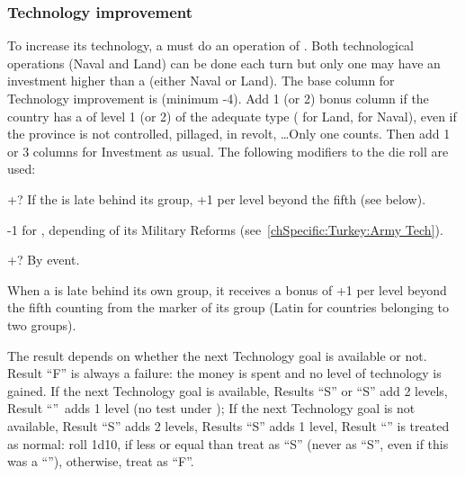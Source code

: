 \subsubsection{Technology improvement}\label{chAdministration:Technology
  Improvement}
\bparag To increase its technology, a \MAJ must do an operation of
. Both technological operations (Naval and Land)
can be done each turn but only one may have an investment higher than a
 (either Naval or Land).
\bparag[Resolution] The base column for Technology improvement is 
(minimum -4).
\bparag Add 1 (or 2) bonus column if the country has a \MNU of level 1 (or 2)
of the adequate type ( for Land,  for Naval), even
if the province is not controlled, pillaged, in revolt, \ldots Only one \MNU
counts.
\bparag Then add 1 or 3 columns for Investment as usual.
\bparag The following modifiers to the die roll are used:
\begin{modlist}
\item[+?] If the \MAJ is late behind its group, +1 per level beyond the fifth
  (see below).
\item[-1] for \TUR, depending of its Military Reforms
  (see~\ref{chSpecific:Turkey:Army Tech}).
\item[+?] By event.
\end{modlist}
\bparag When a \MAJ is late behind its own group, it receives a bonus of +1
per level beyond the fifth counting from the marker of its group (Latin for
countries belonging to two groups).

The result depends on whether the next Technology goal is available or not.
\bparag Result ``F'' is always a failure: the money is spent and no level of
technology is gained.
\bparag If the next Technology goal is available, Results ``S'' or
``S\textetoile'' add 2 levels, Result ``\undemi''\ adds 1 level (no test under
\FTI);
\bparag If the next Technology goal is not available, Result ``S\textetoile''
adds 2 levels, Results ``S'' adds 1 level, Result ``\undemi'' is treated as
normal: roll 1d10, if less or equal than \FTI treat as ``S'' (never as
``S\textetoile'', even if this was a ``\undemi\textetoile''), otherwise, treat
as ``F''.

